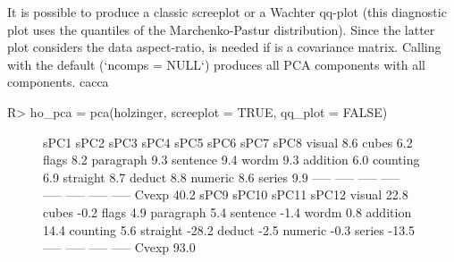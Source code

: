 \documentclass[article]{jss}
\newcommand{\fct}[1]{\code{#1()}}
\begin{document}
It is possible to produce a classic screeplot or a Wachter qq-plot (this diagnostic plot uses the quantiles of the Marchenko-Pastur distribution). Since the latter plot considers the data aspect-ratio,  is needed if  is a covariance matrix.
Calling \fct{pca} with the default (`ncomps = NULL`) produces all PCA components with all components. cacca
\begin{Schunk}
\begin{Sinput}
R> ho_pca = pca(holzinger, screeplot = TRUE, qq_plot = FALSE)
\end{Sinput}
\end{Schunk}
\begin{figure}[H]
\centering
\begin{Schunk}
\begin{Soutput}
            sPC1   sPC2   sPC3   sPC4   sPC5   sPC6   sPC7   sPC8
visual      8.6%
cubes       6.2%
flags       8.2%
paragraph   9.3%
sentence    9.4%
wordm       9.3%
addition    6.0%
counting    6.9%
straight    8.7%
deduct      8.8%
numeric     8.6%
series      9.9%
           -----  -----  -----  -----  -----  -----  -----  -----
Cvexp      40.2%
            sPC9  sPC10  sPC11  sPC12
visual     22.8%
cubes      -0.2%
flags       4.9%
paragraph   5.4%
sentence   -1.4%
wordm       0.8%
addition   14.4%
counting    5.6%
straight  -28.2%
deduct     -2.5%
numeric    -0.3%
series    -13.5%
           -----  -----  -----  -----
Cvexp      93.0%
\end{Soutput}
\end{Schunk}
\begin{Schunk}
\begin{Soutput}

\end{Soutput}
\end{Schunk}
\end{figure}
\end{document}
